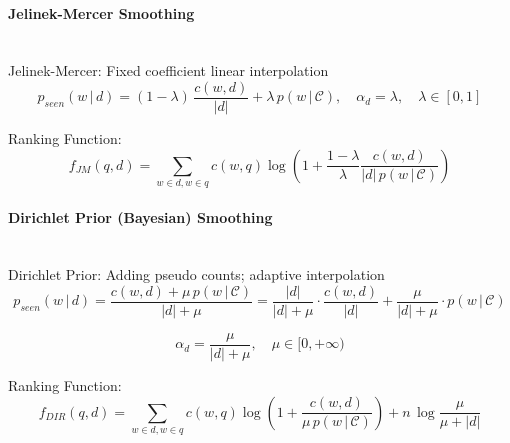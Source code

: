 \newpage
\paragraph{Jelinek-Mercer Smoothing}\mbox{}\\

Jelinek-Mercer: Fixed coefficient linear interpolation
\begin{equation*}
p_{seen}(w \,\big|\, d) = (1-\lambda) \, \dfrac{c(w, d)}{|d|} + \lambda \, p(w \,\big|\, \mathcal{C}), \quad \alpha_d = \lambda, \quad \lambda \in [0, 1]
\end{equation*}

Ranking Function:
\begin{equation*}
f_{JM}(q, d) = \sum_{w \in d, w \in q} c(w, q) \log \left( 1 + \frac{1-\lambda}{\lambda} \frac{c(w, d)}{|d| \, p(w \,\big|\, \mathcal{C})} \right)
\end{equation*}



\paragraph{Dirichlet Prior (Bayesian) Smoothing}\mbox{}\\

Dirichlet Prior: Adding pseudo counts; adaptive interpolation
\begin{equation*}
p_{seen}(w \,\big|\, d) = \dfrac{c(w, d) + \mu \, p(w \,\big|\, \mathcal{C})}{|d| + \mu} = \dfrac{|d|}{|d| + \mu}\cdot\dfrac{c(w,d)}{|d|} + \dfrac{\mu}{|d| + \mu}\cdot p(w \,\big|\, \mathcal{C})
\end{equation*}

\begin{equation*}
\alpha_d = \frac{\mu}{|d| + \mu}, \quad \mu \in [0, +\infty)
\end{equation*}

Ranking Function:
\begin{equation*}
f_{DIR}(q, d) = \sum_{w \in d, w \in q} c(w, q) \log \left( 1 + \frac{c(w, d)}{\mu \, p(w \,\big|\, \mathcal{C})} \right) + n\,\log\frac{\mu}{\mu + |d|}
\end{equation*}

